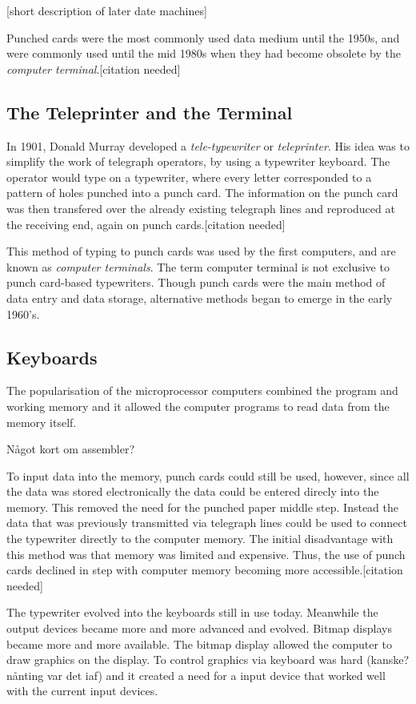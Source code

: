 [short description of later date machines]

Punched cards were the most commonly used data medium until the 1950s, and were commonly used until the mid 1980s when they had become obsolete by the \emph{computer terminal}.[citation needed]

\subsection{The Teleprinter and the Terminal}
In 1901, Donald Murray developed a \emph{tele-typewriter} or \emph{teleprinter}. His idea was to simplify the work of telegraph operators, by using a typewriter keyboard. The operator would type on a typewriter, where every letter corresponded to a pattern of holes punched into a punch card. The information on the punch card was then transfered over the already existing telegraph lines and reproduced at the receiving end, again on punch cards.[citation needed]

This method of typing to punch cards was used by the first computers, and are known as \emph{computer terminals}. The term computer terminal is not exclusive to punch card-based typewriters. Though punch cards were the main method of data entry and data storage, alternative methods began to emerge in the early 1960's. 


\subsection{Keyboards}

The popularisation of the microprocessor computers combined the program and working memory and it allowed the computer programs to read data from the memory itself. 

Något kort om assembler?

To input data into the memory, punch cards could still be used, however, since all the data was stored electronically the data could be entered direcly into the memory. This removed the need for the punched paper middle step. Instead the data that was previously transmitted via telegraph lines could be used to connect the typewriter directly to the computer memory. The initial disadvantage with this method was that memory was limited and expensive. Thus, the use of punch cards declined in step with computer memory becoming more accessible.[citation needed]

The typewriter evolved into the keyboards still in use today. Meanwhile the output devices became more and more advanced and evolved. Bitmap displays became more and more available. The bitmap display allowed the computer to draw graphics on the display. To control graphics via keyboard was hard (kanske? nånting var det iaf) and it created a need for a input device that worked well with the current input devices.

